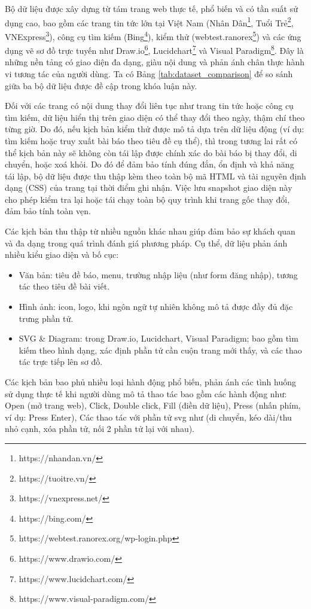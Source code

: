 \documentclass[a4paper, 12pt]{report}
\begin{document}
{Bộ dữ liệu được xây dựng từ tám trang web thực tế, phổ biến và có tần suất sử dụng cao, bao gồm các trang tin tức lớn tại Việt Nam (Nhân Dân\footnote{https://nhandan.vn/}, Tuổi Trẻ\footnote{https://tuoitre.vn/}, VNExpress\footnote{https://vnexpress.net/}), công cụ tìm kiếm (Bing\footnote{https://bing.com/}), kiểm thử (webtest.ranorex\footnote{https://webtest.ranorex.org/wp-login.php}) và các ứng dụng vẽ sơ đồ trực tuyến như Draw.io\footnote{https://www.drawio.com/}, Lucidchart\footnote{https://www.lucidchart.com/} và Visual Paradigm\footnote{https://www.visual-paradigm.com/}. Đây là những nền tảng có giao diện đa dạng, giàu nội dung và phản ánh chân thực hành vi tương tác của người dùng. Ta có Bảng \ref{tab:dataset_comparison} để so sánh giữa ba bộ dữ liệu được đề cập trong khóa luận này.


Đối với các trang có nội dung thay đổi liên tục như trang tin tức hoặc công cụ tìm kiếm, dữ liệu hiển thị trên giao diện có thể thay đổi theo ngày, thậm chí theo từng giờ. Do đó, nếu kịch bản kiểm thử được mô tả dựa trên dữ liệu động (ví dụ: tìm kiếm hoặc truy xuất bài báo theo tiêu đề cụ thể), thì trong tương lai rất có thể kịch bản này sẽ không còn tái lập được chính xác do bài báo bị thay đổi, di chuyển, hoặc xoá khỏi. Do đó để đảm bảo tính đúng đắn, ổn định và khả năng tái lập, bộ dữ liệu được thu thập kèm theo toàn bộ mã HTML và tài nguyên định dạng (CSS) của trang tại thời điểm ghi nhận. Việc lưu snapshot giao diện này cho phép kiểm tra lại hoặc tái chạy toàn bộ quy trình khi trang gốc thay đổi, đảm bảo tính toàn vẹn.


Các kịch bản thu thập từ nhiều nguồn khác nhau giúp đảm bảo sự khách quan và đa dạng trong quá trình đánh giá phương pháp. Cụ thể, dữ liệu phản ánh nhiều kiểu giao diện và bố cục:

\begin{itemize}
    \item Văn bản: tiêu đề báo, menu, trường nhập liệu (như form đăng nhập), tương tác theo tiêu đề bài viết.
    
    \item Hình ảnh: icon, logo, khi ngôn ngữ tự nhiên không mô tả được đầy đủ đặc trưng phần tử.
    
    \item SVG \& Diagram: trong Draw.io, Lucidchart, Visual Paradigm; bao gồm tìm kiếm theo hình dạng, xác định phần tử cần cuộn trang mới thấy, và các thao tác trực tiếp lên sơ đồ.
\end{itemize}


Các kịch bản bao phủ nhiều loại hành động phổ biến, phản ánh các tình huống sử dụng thực tế khi người dùng mô tả thao tác bao gồm các hành động như: Open (mở trang web), Click, Double click, Fill (điền dữ liệu), Press (nhấn phím, ví dụ: Press Enter), Các thao tác với phần tử svg như (di chuyển, kéo dài/thu nhỏ cạnh, xóa phần tử, nối 2 phần tử lại với nhau).










}
\end{document}
